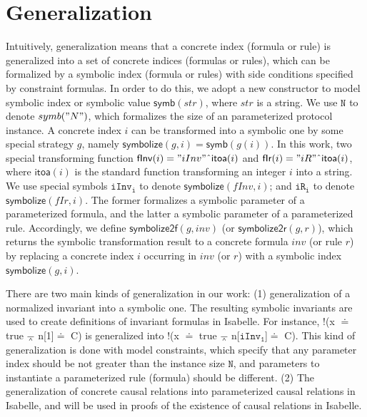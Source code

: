 \documentclass[final]{IEEEtran}
\def \andc {\barwedge }
\def \negc {!}
\def \cat {\symbol{94}}
\def \iInv {iInv}
\def \iR {iR}
\newcommand\cai[1]{\textcolor{blue}{ #1} }
\begin{document}
\section{Generalization}\label{sec:generalization}
Intuitively, generalization means that a concrete index (formula or rule) is generalized into a set of concrete indices (formulas or rules), which can be formalized  by a symbolic index (formula or rules) with side conditions  specified by   constraint formulas.     In order to do this, we  adopt a new constructor  to model symbolic index or symbolic value $\mathsf{symb}(str)$, where $str$ is   a string.  We use $\mathtt{N}$ to denote $symb("N")$, which formalizes the size of an parameterized protocol instance. A concrete index $i$ can be transformed into a symbolic one by some special strategy $g$, namely  $\mathsf{symbolize}(g,i)=\mathsf{symb}(g(i))$. In this work, two special transforming function $\mathsf{fInv}(i)="iInv"\cat \mathsf{itoa}(i)$ and $\mathsf{fIr}(i)="iR"\cat \mathsf{itoa}(i)$, where $\mathsf{itoa}(i)$ is the standard function transforming an integer $i$ into a string. We use  special symbols $\mathtt{\iInv_i}$  to denote $\mathsf{symbolize}(fInv,i)$;  and $\mathtt{\iR_i}$ to denote $\mathsf{symbolize}(fIr,i)$. The former formalizes a symbolic parameter of a parameterized   formula, and the latter    a symbolic  parameter of a parameterized rule. Accordingly, we define $\mathsf{symbolize2f}(g,inv)$ (or  $\mathsf{symbolize2r}(g,r)$), which returns the symbolic transformation result to a concrete formula $inv$ (or rule $r$) by replacing a concrete index $i$ occurring in $inv$ (or $r$) with a symbolic index $\mathsf{symbolize}(g,i)$.


There are two
main kinds of generalization in our work: (1) generalization of a normalized invariant into a symbolic one. %
The resulting symbolic invariants are used to create definitions of invariant formulas in Isabelle. For instance,  $\negc$(x $\doteq$ true $\andc$ n[1]$\doteq$ C) is generalized into $\negc$(x $\doteq$ true $\andc$ n[$\mathtt{\iInv_1}$]$\doteq$ C).  This kind of generalization is done with model constraints, which  specify  that any parameter index should be not greater than the instance size $\mathtt{N}$, and parameters to instantiate a parameterized rule (formula) should be different. (2) The generalization of concrete causal relations into parameterized causal relations in Isabelle, and will be used in proofs of the existence  of causal relations in Isabelle.
\end{document}
